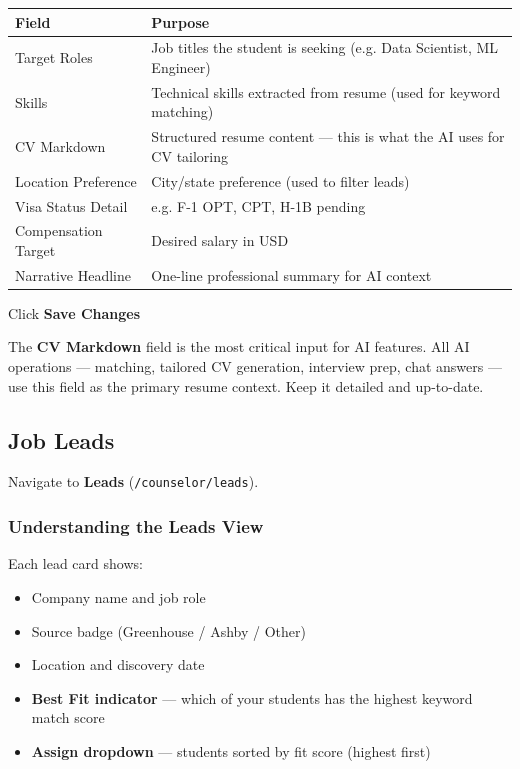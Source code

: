 \documentclass[11pt, a4paper]{article}
\newcounter{stepcnt}
\newcommand{\step}[1]{%
  \stepcounter{stepcnt}%
  \vspace{0.4em}%
  \noindent\makebox[1.8em][l]{\textcolor{white}{\small%
    \tikz[baseline=(n.base)]\node[circle,fill=accent,inner sep=1.5pt](n){\footnotesize\bfseries\thestepcnt};%
  }}\hspace{0.3em}#1\par%
}
\newcommand{\nav}[1]{\textbf{\textcolor{accent}{#1}}}
\begin{document}
\begin{center}
\begin{tabularx}{0.95\linewidth}{lX}
  \toprule
  \textbf{Field} & \textbf{Purpose} \\
  \midrule
  Target Roles       & Job titles the student is seeking (e.g. Data Scientist, ML Engineer) \\
  Skills             & Technical skills extracted from resume (used for keyword matching) \\
  CV Markdown        & Structured resume content — this is what the AI uses for CV tailoring \\
  Location Preference & City/state preference (used to filter leads) \\
  Visa Status Detail & e.g. F-1 OPT, CPT, H-1B pending \\
  Compensation Target & Desired salary in USD \\
  Narrative Headline & One-line professional summary for AI context \\
  \bottomrule
\end{tabularx}
\end{center}

\step{Click \nav{Save Changes}}

\begin{infobox}
The \textbf{CV Markdown} field is the most critical input for AI features. All AI operations — matching, tailored CV generation, interview prep, chat answers — use this field as the primary resume context. Keep it detailed and up-to-date.
\end{infobox}

\subsection{Job Leads}

Navigate to \nav{Leads} (\texttt{/counselor/leads}).

\subsubsection{Understanding the Leads View}

Each lead card shows:
\begin{itemize}
  \item Company name and job role
  \item Source badge (Greenhouse / Ashby / Other)
  \item Location and discovery date
  \item \textbf{Best Fit indicator} — which of your students has the highest keyword match score
  \item \textbf{Assign dropdown} — students sorted by fit score (highest first)
\end{itemize}
\end{document}
